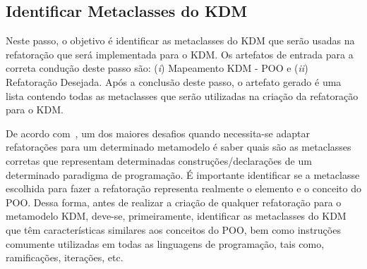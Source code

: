 \subsection{Identificar Metaclasses do KDM}\label{sec:mapeamento_POO_e_KDM}

Neste passo, o objetivo é identificar as metaclasses do KDM que serão usadas na refatoração que será implementada para o KDM. Os artefatos de entrada para a correta condução deste passo são: (\textit{i}) Mapeamento KDM - POO e (\textit{ii}) Refatoração Desejada. Após a conclusão deste passo, o artefato gerado é uma lista contendo todas as metaclasses que serão utilizadas na criação da refatoração para o KDM.

De acordo com~, um dos maiores desafios quando necessita-se adaptar refatorações para um determinado metamodelo é saber quais são as metaclasses corretas que representam determinadas construções/declarações de um determinado paradigma de programação. É importante identificar se a metaclasse escolhida para fazer a refatoração representa realmente o elemento e o conceito do POO. Dessa forma, antes de realizar a criação de qualquer refatoração para o metamodelo KDM, deve-se, primeiramente, identificar as metaclasses do KDM que têm características similares aos conceitos do POO, bem como instruções comumente utilizadas em todas as linguagens de programação, tais como, ramificações, iterações, etc. 

